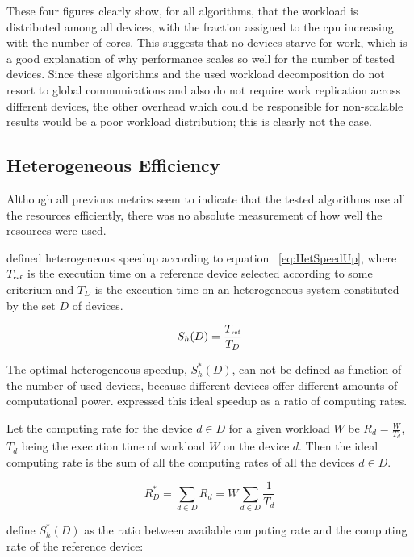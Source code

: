 These four figures clearly show, for all algorithms, that the workload is distributed among all devices, with the fraction assigned to the \gls{cpu} increasing with the number of cores. This suggests that no devices starve for work, which is a good explanation of why performance scales so well for the number of tested devices. Since these algorithms and the used workload decomposition do not resort to global communications and also do not require work replication across different devices, the other overhead which could be responsible for non-scalable results would be a poor workload distribution; this is clearly not the case.

\subsection{\label{sec:hefficiency} Heterogeneous Efficiency}

Although all previous metrics seem to indicate that the tested algorithms use all the resources efficiently, there was no absolute measurement of how well the resources were used.

\cite{Chamberlain98} defined heterogeneous speedup according to equation ~\ref{eq:HetSpeedUp}, where $T_{\mbox{\tiny ref}}$ is the execution time on a reference device selected according to some criterium and $T_D$ is the execution time on an heterogeneous system constituted by the set $D$ of devices.

\begin{equation}
S_h(D) = \frac{T_{\mbox{\tiny ref}}}{T_D}
\label{eq:HetSpeedUp}
\end{equation}

The optimal heterogeneous speedup, $S_h^*(D)$, can not be defined as function of the number of used devices, because different devices offer different amounts of computational power. \cite{Chamberlain98} expressed this ideal speedup as a ratio of computing rates.

Let the computing rate for the device $d \in D$ for a given workload $W$ be $R_d = \frac{W}{T_d}$, $T_d$ being the execution time of workload $W$ on the device $d$. Then the ideal computing rate is the sum of all the computing rates of all the devices $d \in D$.

\begin{equation}
R^*_D = \sum_{d \in D} R_d = W \sum_{d \in D} \frac{1}{T_d}
\label{eq:StarCapacity}
\end{equation}

\cite{Chamberlain98} define $S_h^*(D)$ as the ratio between available computing rate and the computing rate of the reference device:

